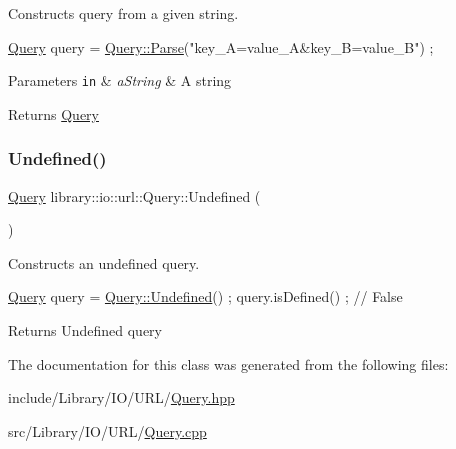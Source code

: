 Constructs query from a given string. 


\begin{DoxyCode}
\hyperlink{classlibrary_1_1io_1_1url_1_1_query_a6781de8f7b7251f8e17c191434b08039}{Query} query = \hyperlink{classlibrary_1_1io_1_1url_1_1_query_aaff385aed5f4af758033066e4f7c70a2}{Query::Parse}(\textcolor{stringliteral}{"key\_A=value\_A&key\_B=value\_B"}) ;
\end{DoxyCode}



\begin{DoxyParams}[1]{Parameters}
\mbox{\tt in}  & {\em a\+String} & A string \\
\hline
\end{DoxyParams}
\begin{DoxyReturn}{Returns}
\hyperlink{classlibrary_1_1io_1_1url_1_1_query}{Query} 
\end{DoxyReturn}
\mbox{\label{classlibrary_1_1io_1_1url_1_1_query_acea48a0bfba96773f6db11d1a904a520}} 
\subsubsection{\texorpdfstring{Undefined()}{Undefined()}}
{\footnotesize\ttfamily \hyperlink{classlibrary_1_1io_1_1url_1_1_query}{Query} library\+::io\+::url\+::\+Query\+::\+Undefined (\begin{DoxyParamCaption}{ }\end{DoxyParamCaption})\hspace{0.3cm}{\ttfamily [static]}}



Constructs an undefined query. 


\begin{DoxyCode}
\hyperlink{classlibrary_1_1io_1_1url_1_1_query_a6781de8f7b7251f8e17c191434b08039}{Query} query = \hyperlink{classlibrary_1_1io_1_1url_1_1_query_acea48a0bfba96773f6db11d1a904a520}{Query::Undefined}() ;
query.isDefined() ; \textcolor{comment}{// False}
\end{DoxyCode}


\begin{DoxyReturn}{Returns}
Undefined query 
\end{DoxyReturn}


The documentation for this class was generated from the following files\+:\begin{DoxyCompactItemize}
\item 
include/\+Library/\+I\+O/\+U\+R\+L/\hyperlink{_query_8hpp}{Query.\+hpp}\item 
src/\+Library/\+I\+O/\+U\+R\+L/\hyperlink{_query_8cpp}{Query.\+cpp}\end{DoxyCompactItemize}
